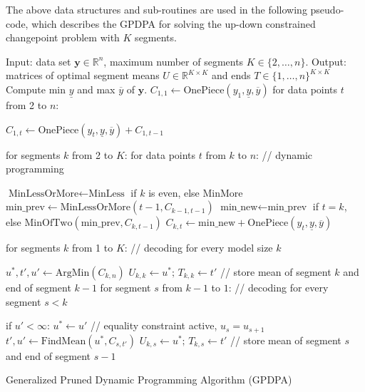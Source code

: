 \documentclass{article}
\newcommand{\FCC}{C}
\newcommand{\RR}{\mathbb R}
\begin{document}
The above data structures and sub-routines are used in the following
pseudo-code, which describes the GPDPA for solving the up-down
constrained changepoint problem with $K$ segments.
\begin{algorithm}[H]
\begin{algorithmic}[1]
\STATE Input: data set $\mathbf y\in\RR^n$, maximum number of segments $K\in\{2,\dots, n\}$.
\STATE Output: matrices of optimal segment means $U\in\RR^{K\times K}$ 
and ends $T\in\{1,\dots,n\}^{K\times K}$
\STATE Compute min $\underline y$ and max $\overline y$ of $\mathbf y$.
\label{line:min-max}
\STATE $\FCC_{1,1}\gets \text{OnePiece}(y_1, \underline y, \overline y)$
\label{line:init-1}
\STATE for data points $t$ from 2 to $n$:
\begin{ALC@g}
  \STATE $\FCC_{1,t}\gets \text{OnePiece}(y_t, \underline y, \overline y) + \FCC_{1,t-1}$
\label{line:init-t}
\end{ALC@g}
\STATE for segments $k$ from 2 to $K$: for data points $t$ from $k$ to $n$: // dynamic programming
\label{line:for-k-t}
\begin{ALC@g}
  \STATE $\text{MinLessOrMore}\gets \text{MinLess}$ if $k$ is even, else MinMore
  \STATE $\text{min\_prev}\gets \text{MinLessOrMore}(t-1, \FCC_{k-1,t-1})$
  \label{line:MinLess}
  \STATE $\text{min\_new}\gets\text{min\_prev}$ if $t=k$, 
else $\text{MinOfTwo}(\text{min\_prev}, \FCC_{k, t-1})$
  \label{line:MinOfTwo}
  \STATE $\FCC_{k,t}\gets \text{min\_new} + \text{OnePiece}(y_t, \underline y, \overline y)$
  \label{line:AddNew}
\end{ALC@g}
\STATE for segments $k$ from 1 to $K$: // decoding for every model size $k$
\label{line:for-k-decoding}
\begin{ALC@g}
  \STATE $u^*,t',u'\gets \text{ArgMin}(\FCC_{k,n})$
  \label{line:ArgMin}
  \STATE $U_{k,k}\gets u^*;\, T_{k,k}\gets t'$ // store mean of segment $k$ and end of segment $k-1$
  \label{line:decode-kk}
  \STATE for segment $s$ from $k-1$ to $1$: // decoding for every segment $s<k$
  \label{line:for-s-decoding}
  \begin{ALC@g}
    \STATE if $u' < \infty$: $u^*\gets u'$ // equality constraint active, $u_s = u_{s+1}$
    \label{line:equality-constraint-active}
    \STATE $t',u'\gets\text{FindMean}(u^*, \FCC_{s,t'})$
    \label{line:FindMean}
    \STATE $U_{k,s}\gets u^*;\, T_{k,s}\gets t'$ // store mean of segment $s$ and end of segment $s-1$
    \label{line:decode-ks}
  \end{ALC@g}
\end{ALC@g}
\caption{\label{algo:GPDPA}Generalized Pruned Dynamic Programming
  Algorithm (GPDPA)}
\end{algorithmic}
\end{algorithm}
\end{document}
